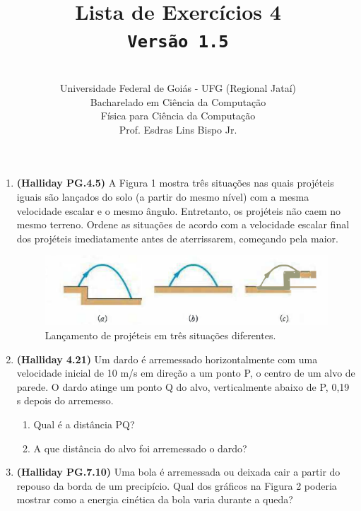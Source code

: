 \documentclass[12pt,a4paper,oneside]{article}
\author{\\Universidade Federal de Goiás - UFG (Regional Jataí) \\Bacharelado em Ciência da Computação \\Física para Ciência da Computação \\Prof. Esdras Lins Bispo Jr.}
\title{
	{\sc \huge Lista de Exercícios 4} 
	\\{\tt Versão 1.5}
}
\begin{document}
\maketitle

\begin{enumerate}

\section{Conceitos}
	
	\item {\bf (Halliday PG.4.5)} A Figura 1 mostra três situações nas quais projéteis iguais são lançados do solo (a partir do mesmo nível) com a mesma velocidade escalar e o mesmo ângulo. Entretanto, os projéteis não caem no mesmo terreno. Ordene as situações de acordo com a velocidade escalar final dos projéteis imediatamente antes de aterrissarem, começando pela maior. 
	
	\begin{figure}[htb]
		\begin{center}
			\includegraphics[scale=0.8]{imagens/fig1}
		\end{center}
		\caption{Lançamento de projéteis em três situações diferentes.}
	\end{figure}
	
	\item {\bf (Halliday 4.21)} Um dardo é arremessado horizontalmente com uma velocidade inicial de 10 m/s em direção a um ponto P, o centro de um alvo de parede. O dardo atinge um ponto Q do alvo, verticalmente abaixo de P, 0,19 s depois do arremesso. \label{q:dardo}
		\begin{enumerate}
			\item Qual é a distância PQ?
			\item A que distância do alvo foi arremessado o dardo?
		\end{enumerate}	
	
	\item {\bf (Halliday PG.7.10)} Uma bola é arremessada ou deixada cair a partir do repouso da borda de um precipício. Qual dos gráficos na Figura 2 poderia mostrar como a energia cinética da bola varia durante a queda?	 \label{q:bola}
	

\end{enumerate}
\end{document}
